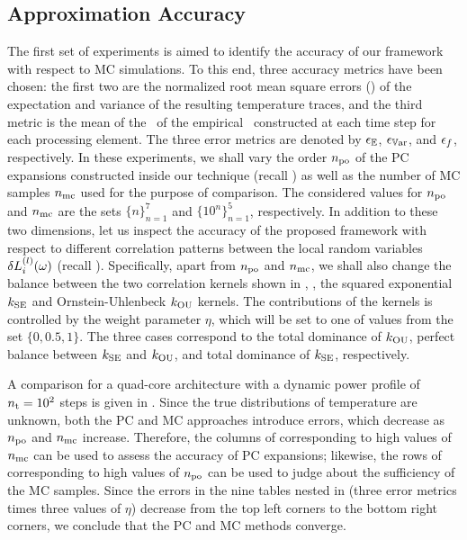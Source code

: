\subsection{Approximation Accuracy} 
The first set of experiments is aimed to identify the accuracy of our framework with respect to MC simulations.
To this end, three accuracy metrics have been chosen: the first two are the normalized root mean square errors (\nrmses) of the expectation and variance of the resulting temperature traces, and the third metric is the mean of the \nrmses\ of the empirical \pdfs\ constructed at each time step for each processing element.
The three error metrics are denoted by $\epsilon_\mathbb{E}$, $\epsilon_{\mathbb{V}\text{ar}}$, and $\epsilon_f$, respectively.
In these experiments, we shall vary the order ${n_\text{po}}$ of the PC expansions constructed inside our technique (recall ) as well as the number of MC samples ${n_\text{mc}}$ used for the purpose of comparison.
The considered values for ${n_\text{po}}$ and ${n_\text{mc}}$ are the sets $\{ n \}_{n = 1}^7$ and $\{ 10^n \}_{n = 1}^5$, respectively.
In addition to these two dimensions, let us inspect the accuracy of the proposed framework with respect to different correlation patterns between the local random variables $\delta L^{(l)}_i(\omega)$ (recall ).
Specifically, apart from ${n_\text{po}}$ and ${n_\text{mc}}$, we shall also change the balance between the two correlation kernels shown in , \ie, the squared exponential $\fCorr_\SE$ and Ornstein-Uhlenbeck $\fCorr_\OU$ kernels.
The contributions of the kernels is controlled by the weight parameter $\eta$, which will be set to one of values from the set $\{ 0, 0.5, 1 \}$.
The three cases correspond to the total dominance of $\fCorr_\OU$, perfect balance between $\fCorr_\SE$ and $\fCorr_\OU$, and total dominance of $\fCorr_\SE$, respectively.


A comparison for a quad-core architecture with a dynamic power profile of ${n_\text{t}} = 10^2$ steps is given in .
Since the true distributions of temperature are unknown, both the PC and MC approaches introduce errors, which decrease as ${n_\text{po}}$ and ${n_\text{mc}}$ increase.
Therefore, the columns of  corresponding to high values of ${n_\text{mc}}$ can be used to assess the accuracy of PC expansions; likewise, the rows of  corresponding to high values of ${n_\text{po}}$ can be used to judge about the sufficiency of the MC samples.
Since the errors in the nine tables nested in  (three error metrics times three values of $\eta$) decrease from the top left corners to the bottom right corners, we conclude that the PC and MC methods converge.

